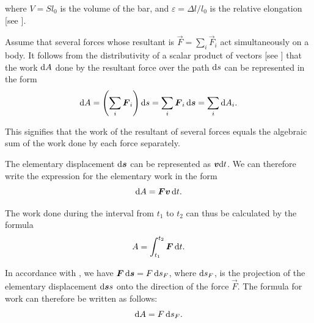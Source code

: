 \noindent
where $V=Sl_0$ is the volume of the bar, and $\varepsilon=\Delta l/l_0$ is the relative elongation [see ].

Assume that several forces whose resultant is $\vec{F}=\sum_{i}\vec{F}_i$ act simultaneously on a body. It follows from the distributivity of a scalar product of vectors [see ] that the work $\mathrm{d} A$ done by the resultant force over the path $\mathrm{d} s$ can be represented in the form
\begin{equation}\label{eq:3_15}
\mathrm{d} A = \left(\sum_{i}\boldsymbol{F}_i\right)\mathrm{d} s = \sum_{i}\boldsymbol{F}_i\,\mathrm{d}\boldsymbol{s} = \sum_{i}\mathrm{d} A_i.
\end{equation}

\noindent
This signifies that the work of the resultant of several forces equals the algebraic sum of the work done by each force separately.

The elementary displacement $\mathrm{d}\boldsymbol{s}$ can be represented as $\boldsymbol{v}\mathrm{d} t$. We can therefore write the expression for the elementary work in the form
\begin{equation}\label{eq:3_16}
\mathrm{d} A = \boldsymbol{F}\boldsymbol{v}\,\mathrm{d} t.
\end{equation}

\noindent
The work done during the interval from $t_1$ to $t_2$ can thus be calculated by the formula
\begin{equation}\label{eq:3_17}
A = \int_{t_1}^{t_2}\boldsymbol{F}\,\mathrm{d} t.
\end{equation}

In accordance with , we have $\boldsymbol{F}\,\mathrm{d}\boldsymbol{s}=F\,\mathrm{d} s_F$, where $\mathrm{d} s_F$, is the projection of the elementary displacement $\mathrm{d}\boldsymbol{s}s$ onto the direction of the force $\vec{F}$. The formula for work can therefore be written as follows:
\begin{equation}\label{eq:3_18}
\mathrm{d} A = F\,\mathrm{d} s_F.
\end{equation}

